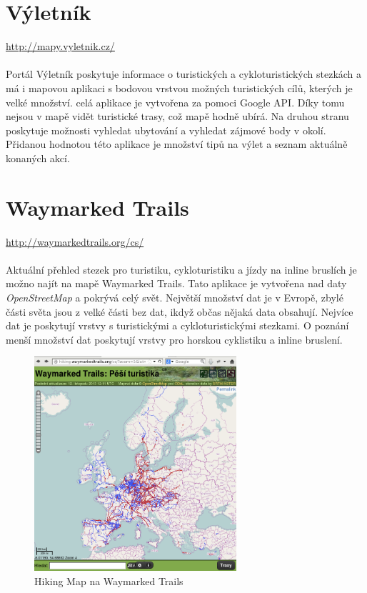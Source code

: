 \documentclass[11pt,a4paper,titlepage,oneside]{book}
\begin{document}
	\section{Výletník}
		\url{http://mapy.vyletnik.cz/}
		\paragraph{} Portál Výletník poskytuje informace o turistických a cykloturistických stezkách a má i mapovou aplikaci s bodovou vrstvou možných turistických cílů, kterých je velké množství. celá aplikace je vytvořena za pomoci Google API. Díky tomu nejsou v mapě vidět turistické trasy, což mapě hodně ubírá. Na druhou stranu poskytuje možnosti vyhledat ubytování a vyhledat zájmové body v okolí. Přidanou hodnotou této aplikace je množství tipů na výlet a seznam aktuálně konaných akcí.
	
	
	\section{Waymarked Trails}
		\url{http://waymarkedtrails.org/cs/}
		\paragraph{} Aktuální přehled stezek pro turistiku, cykloturistiku a jízdy na inline bruslích je možno najít na mapě Waymarked Trails\cite{Waymarked}. Tato aplikace je vytvořena nad daty \textit{OpenStreetMap} a pokrývá celý svět. Největší množství dat je v Evropě, zbylé části světa jsou z velké části bez dat, ikdyž občas nějaká data obsahují. Nejvíce dat je poskytují vrstvy s turistickými a cykloturistickými stezkami. O poznání menší množství dat poskytují vrstvy pro horskou cyklistiku a inline bruslení.

		\begin{figure}[!h]
			\begin{center}
				\includegraphics[width=7.5cm]{obrazky/waymarkedTrails.png}
				\caption{Hiking Map na Waymarked Trails}
			\end{center}
		\end{figure}
	
\end{document}
